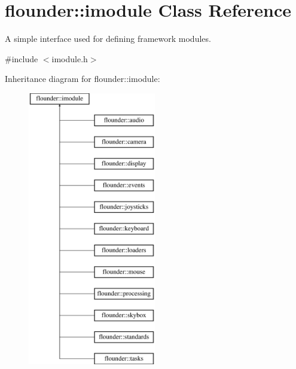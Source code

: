 \hypertarget{classflounder_1_1imodule}{}\section{flounder\+:\+:imodule Class Reference}
\label{classflounder_1_1imodule}


A simple interface used for defining framework modules.  




{\ttfamily \#include $<$imodule.\+h$>$}

Inheritance diagram for flounder\+:\+:imodule\+:\begin{figure}[H]
\begin{center}
\leavevmode
\includegraphics[height=12.000000cm]{classflounder_1_1imodule}
\end{center}
\end{figure}
